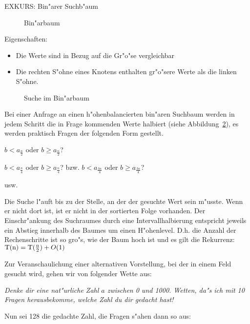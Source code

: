 \documentclass[draft,12pt]{scrreprt}
\theoremstyle{break}
\begin{document}
EXKURS: Bin"arer Suchb"aum
\begin{figure}[H]
	\begin{center}\end{center}
	\caption{Bin"arbaum}
	\label{271003a}
\end{figure}

Eigenschaften:
\begin{itemize}
	\item Die Werte sind in Bezug auf die Gr"o"se vergleichbar
	\item Die rechten S"ohne eines Knotens enthalten gr"o"sere Werte als die linken S"ohne.
\end{itemize}

\begin{figure}
	\begin{center}\end{center}
	\caption{Suche im Bin"arbaum}
	\label{271003b}
\end{figure}

Bei einer Anfrage an einen h"ohenbalancierten bin"aren Suchbaum werden in jedem Schritt die in Frage kommenden Werte halbiert (siehe Abbildung~\ref{271003b}), es
werden praktisch Fragen der folgenden Form gestellt.

 \quad \( b < a_{\frac{n}{2}} \) oder \( b \geq a_{\frac{n}{2}} \)?
 
 \quad \( b < a_{\frac{n}{4}} \) oder \( b \geq a_{\frac{n}{4}} \)? bzw. \( b < a_{\frac{3n}{4}} \) oder \( b \geq a_{\frac{3n}{4}} \)?

 \quad usw. 
 
Die Suche l"auft bis zu der Stelle, an der der gesuchte Wert sein m"usste. Wenn er nicht dort ist, ist er nicht in der sortierten Folge
vorhanden.
%
Der Einschr"ankung des Suchraumes durch eine Intervallhalbierung entspricht jeweils ein Abstieg innerhalb des Baumes um einen
H"ohenlevel. D.h. die Anzahl der Rechenschritte ist so gro"s, wie der Baum hoch ist und es gilt die Rekurrenz: 
\(\textup{T}(\textup{n})=\textup{T}(\frac{\textup{n}}{2}) + O(1)\)

Zur Veranschaulichung einer alternativen Vorstellung, bei der in einem Feld gesucht wird, gehen wir von folgender Wette aus:

\textit{Denke dir eine nat"urliche Zahl $a$ zwischen 0 und 1000. Wetten, da"s ich mit 10 Fragen herausbekomme, welche Zahl du dir gedacht
hast!}

Nun sei 128 die gedachte Zahl, die Fragen s"ahen dann so aus:
\end{document}
